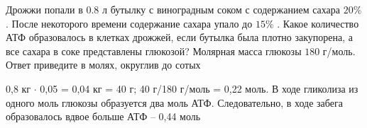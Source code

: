
Дрожжи попали в 0.8 л бутылку с виноградным соком с
содержанием сахара $20\%$ . После некоторого времени содержание сахара упало до
$15\%$ . Какое количество АТФ образовалось в клетках дрожжей, если бутылка была
плотно закупорена, а все сахара в соке представлены глюкозой?  Молярная масса глюкозы $180$  г/моль. Ответ
приведите в молях, округлив до сотых

\soultionSection

0,8 кг $\cdot$ 0,05 = 0,04 кг = 40 г; 40 г/180 г/моль = 0,22 моль. В ходе гликолиза из одного моль глюкозы образуется два моль АТФ. Следовательно, в ходе забега образовалось вдвое больше АТФ – 0,44 моль

